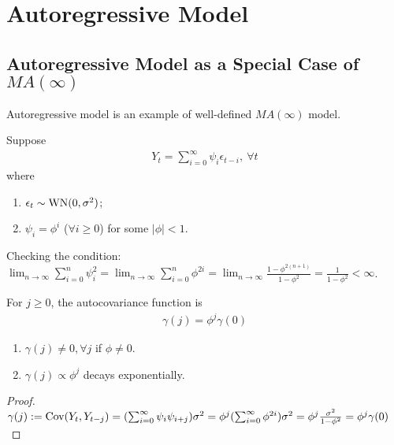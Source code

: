 \documentclass[11pt]{elegantbook}
\begin{document}
\section{Autoregressive Model}
\subsection{Autoregressive Model as a Special Case of $MA(\infty)$}
Autoregressive model is an example of well-defined $MA(\infty)$ model.
\begin{example}
    Suppose
    \begin{equation}
        \begin{aligned}
            Y_{t}=\sum_{i=0}^\infty \psi_i\epsilon_{t-i},\ \forall t
        \end{aligned}
        \nonumber
    \end{equation}
    where
    \begin{enumerate}[$\circ$]
        \item $\epsilon_t\sim \textnormal{WN}(0,\sigma^2)$;
        \item $\psi_i=\phi^i$ ($\forall i\geq 0$) for some $|\phi|<1$.
    \end{enumerate}
\end{example}
Checking the condition: $\lim_{n \rightarrow \infty}\sum_{i=0}^n\psi_i^2=\lim_{n \rightarrow \infty}\sum_{i=0}^n\phi^{2i}=\lim_{n \rightarrow \infty}\frac{1-\phi^{2(n+1)}}{1-\phi^2}=\frac{1}{1-\phi^2}<\infty$.

\begin{lemma}
    For $j\geq 0$, the autocovariance function is
    \begin{equation}
        \begin{aligned}
            \gamma(j)=\phi^j \gamma(0)
        \end{aligned}
        \nonumber
    \end{equation}
    \begin{note}
        \begin{enumerate}
            \item $\gamma(j)\neq 0, \forall j$ if $\phi\neq 0$.
            \item $\gamma(j)\propto \phi^j$ decays exponentially.
        \end{enumerate}
    \end{note}
\end{lemma}
\begin{proof}
    $\gamma(j):=\textnormal{Cov}(Y_t,Y_{t-j})=(\sum_{i=0}^{\infty}\psi_i\psi_{i+j})\sigma^2=\phi^{j}(\sum_{i=0}^{\infty}\phi^{2i})\sigma^2=\phi^j\frac{\sigma^2}{1-\phi^2}=\phi^j \gamma(0)$
\end{proof}
\end{document}
